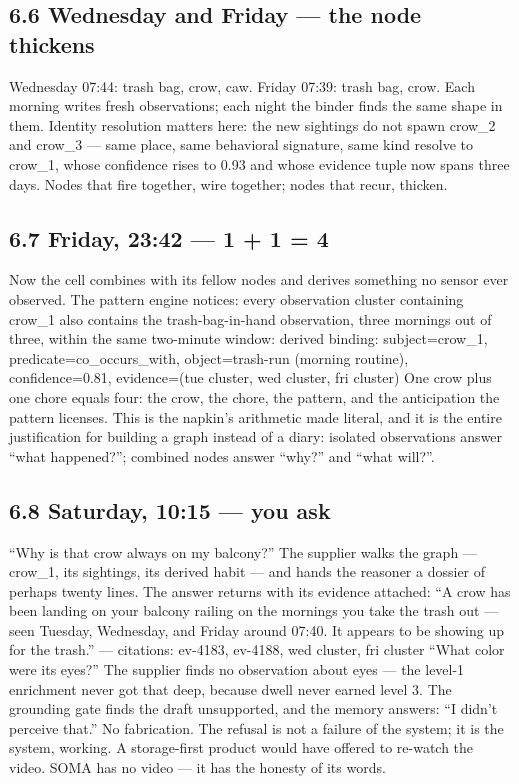 \subsection{6.6 Wednesday and Friday --- the node thickens}\label{wednesday-and-friday-the-node-thickens}

Wednesday 07:44: trash bag, crow, caw. Friday 07:39: trash bag, crow. Each morning writes fresh observations; each night the binder finds the same shape in them. Identity resolution matters here: the new sightings do not spawn crow\_2 and crow\_3 --- same place, same behavioral signature, same kind resolve to crow\_1, whose confidence rises to 0.93 and whose evidence tuple now spans three days. Nodes that fire together, wire together; nodes that recur, thicken.

\subsection{6.7 Friday, 23:42 --- 1 + 1 = 4}\label{friday-2342-1-1-4}

Now the cell combines with its fellow nodes and derives something no sensor ever observed. The pattern engine notices: every observation cluster containing crow\_1 also contains the trash-bag-in-hand observation, three mornings out of three, within the same two-minute window: derived binding: subject=crow\_1, predicate=co\_occurs\_with, object=trash-run (morning routine), confidence=0.81, evidence=(tue cluster, wed cluster, fri cluster) One crow plus one chore equals four: the crow, the chore, the pattern, and the anticipation the pattern licenses. This is the napkin's arithmetic made literal, and it is the entire justification for building a graph instead of a diary: isolated observations answer ``what happened?''; combined nodes answer ``why?'' and ``what will?''.

\subsection{6.8 Saturday, 10:15 --- you ask}\label{saturday-1015-you-ask}

``Why is that crow always on my balcony?'' The supplier walks the graph --- crow\_1, its sightings, its derived habit --- and hands the reasoner a dossier of perhaps twenty lines. The answer returns with its evidence attached: ``A crow has been landing on your balcony railing on the mornings you take the trash out --- seen Tuesday, Wednesday, and Friday around 07:40. It appears to be showing up for the trash.'' --- citations: ev-4183, ev-4188, wed cluster, fri cluster ``What color were its eyes?'' The supplier finds no observation about eyes --- the level-1 enrichment never got that deep, because dwell never earned level 3. The grounding gate finds the draft unsupported, and the memory answers: ``I didn't perceive that.'' No fabrication. The refusal is not a failure of the system; it is the system, working. A storage-first product would have offered to re-watch the video. SOMA has no video --- it has the honesty of its words.

